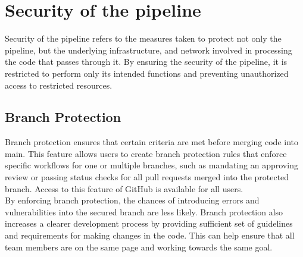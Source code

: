 \section{Security of the pipeline}
\label{Security of the pipeline}
Security of the pipeline refers to the measures taken to protect not only the pipeline, but the underlying infrastructure, and network involved in processing the code that passes through it. By ensuring the security of the pipeline, it is restricted to perform only its intended functions and preventing unauthorized access to restricted resources.  

\subsection{Branch Protection}
Branch protection ensures that certain criteria are met before merging code into main. This feature allows users to create branch protection rules that enforce specific workflows for one or multiple branches, such as mandating an approving review or passing status checks for all pull requests merged into the protected branch. Access to this feature of GitHub is available for all users.\cite{branch}
\\
By enforcing branch protection, the chances of introducing errors and vulnerabilities into the secured branch are less likely. Branch protection also increases a clearer development process by providing sufficient set of guidelines and requirements for making changes in the code. This can help ensure that all team members are on the same page and working towards the same goal. 


